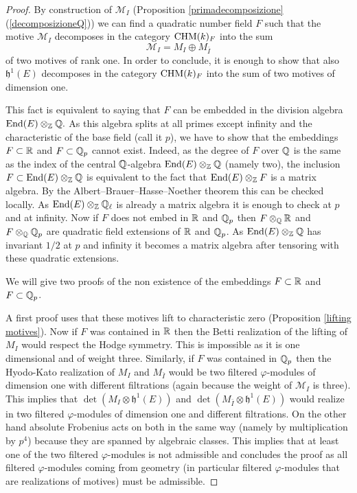 \begin{proof}

By construction of   $\mathcal{M}_I$ (Proposition  \ref{primadecomposizione}(\ref{decomposizioneQ})) we can find a quadratic number field $F$  such that the motive $\mathcal{M}_{I} $  decomposes in the category $\mathrm{CHM} (k)_{F}$ into the sum
\[\mathcal{M}_{I} = M_{I} \oplus  M_{\bar{I}}  \] of two motives of rank one. In order to conclude, it is enough to show that also $\mathfrak{h}^1(E)$  decomposes in the category $\mathrm{CHM} (k)_{F}$ into the sum of two motives of dimension one.

This fact is equivalent to saying that $F$ can be embedded in the division algebra $\textnormal{End}(E)\otimes_{\mathbb{Z}} \mathbb{Q}.$ As this algebra splits at all primes except infinity and  the characteristic of the base field (call it $p$), we have to show that the embeddings $F \subset \mathbb{R}$ and $F\subset \mathbb{Q}_p$ cannot exist. Indeed, as the degree of $F$ over $\mathbb{Q}$ is the same as the index of the central $\mathbb{Q}$-algebra $\textnormal{End}(E)\otimes_{\mathbb{Z}} \mathbb{Q}$ (namely two), the inclusion  $F\subset\textnormal{End}(E)\otimes_{\mathbb{Z}} \mathbb{Q}$ is equivalent to the fact that $\textnormal{End}(E)\otimes_{\mathbb{Z}} F$ is a matrix algebra. By the Albert--Brauer--Hasse--Noether theorem this can be checked locally. As $\textnormal{End}(E)\otimes_{\mathbb{Z}} \mathbb{Q}_\ell$ is already a matrix algebra it is enough to check at $p$ and at infinity. Now if $F $ does not embed in $\mathbb{R}$ and $\mathbb{Q}_p$ then $F\otimes_{\mathbb{Q}} \mathbb{R}$ and $F\otimes_{\mathbb{Q}}\mathbb{Q}_p$ are quadratic field extensions of $\mathbb{R}$ and $\mathbb{Q}_p$. As $\textnormal{End}(E)\otimes_{\mathbb{Z}} \mathbb{Q}$ has invariant $1/2$ at $p$ and infinity it becomes a matrix algebra after tensoring with these quadratic extensions.

We will give two proofs of the non existence of the embeddings $F \subset \mathbb{R}$ and $F\subset \mathbb{Q}_p$.

A first proof uses that these motives lift to characteristic zero (Proposition \ref{lifting motives}).
Now if $F$ was contained in $\mathbb{R}$ then the Betti realization of the lifting of $M_{I}$ would respect the Hodge symmetry. This is impossible as it is one dimensional and of weight three. Similarly, if $F$ was contained in $\mathbb{Q}_p$ then the Hyodo-Kato realization of $M_{I}$ and $M_{\bar{I}} $ would be two filtered $\varphi$-modules of dimension one with different filtrations (again because the weight of $\mathcal{M}_{I}$ is three). This implies that
$\det (M_{I}  \otimes \mathfrak{h}^1(E))$ and $\det(M_{\bar{I}}  \otimes \mathfrak{h}^1(E))$ would realize in two filtered $\varphi$-modules of dimension one and different filtrations.  On the other hand   absolute Frobenius acts on both   in the same way (namely by multiplication by $p^4$) because they are spanned by algebraic classes. This implies that at least one of the two filtered $\varphi$-modules is not admissible and concludes the proof as all filtered $\varphi$-modules coming from geometry (in particular filtered $\varphi$-modules that are realizations of motives) must be admissible.


\end{proof}

